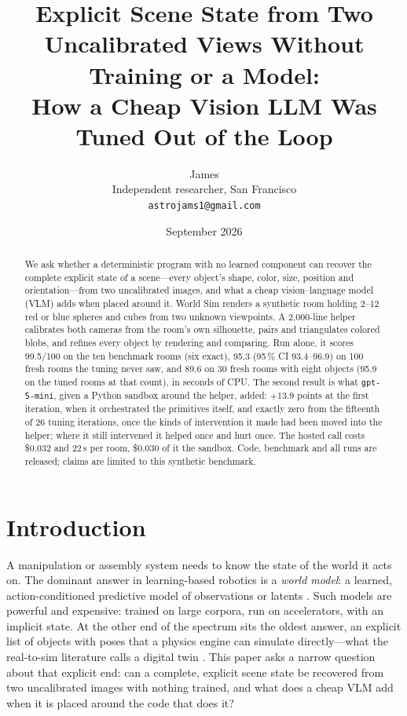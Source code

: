 \documentclass[10pt,a4paper]{article}
\title{\textbf{Explicit Scene State from Two Uncalibrated Views Without Training or a Model:\\ How a Cheap Vision LLM Was Tuned Out of the Loop}}
\author{James\\ Independent researcher, San Francisco\\ \texttt{astrojams1@gmail.com}}
\date{September 2026}
\newcommand{\ws}{World Sim}
\begin{document}
\maketitle

\begin{abstract}
We ask whether a deterministic program with no learned component can recover the complete explicit state of a scene---every object's shape, color, size, position and orientation---from two uncalibrated images, and what a cheap vision--language model (VLM) adds when placed around it. \ws{} renders a synthetic room holding 2--12 red or blue spheres and cubes from two unknown viewpoints. A 2,000-line helper calibrates both cameras from the room's own silhouette, pairs and triangulates colored blobs, and refines every object by rendering and comparing. Run alone, it scores 99.5/100 on the ten benchmark rooms (six exact), 95.3 (95\,\% CI 93.4--96.9) on 100 fresh rooms the tuning never saw, and 89.6 on 30 fresh rooms with eight objects (95.9 on the tuned rooms at that count), in seconds of CPU. The second result is what \texttt{gpt-5-mini}, given a Python sandbox around the helper, added: $+13.9$ points at the first iteration, when it orchestrated the primitives itself, and exactly zero from the fifteenth of 26 tuning iterations, once the kinds of intervention it made had been moved into the helper; where it still intervened it helped once and hurt once. The hosted call costs \$0.032 and 22\,s per room, \$0.030 of it the sandbox. Code, benchmark and all runs are released; claims are limited to this synthetic benchmark.
\end{abstract}

\section{Introduction}

A manipulation or assembly system needs to know the state of the world it acts on. The dominant answer in learning-based robotics is a \emph{world model}: a learned, action-conditioned predictive model of observations or latents \citep{ha2018world,hafner2019dream,hafner2023mastering,assran2025v,nvidia2025cosmos}. Such models are powerful and expensive: trained on large corpora, run on accelerators, with an implicit state. At the other end of the spectrum sits the oldest answer, an explicit list of objects with poses that a physics engine can simulate directly---what the real-to-sim literature calls a digital twin \citep{dai2024automated,chen2024urdformer,mandi2024real2code}. This paper asks a narrow question about that explicit end: can a complete, explicit scene state be recovered from two uncalibrated images with nothing trained, and what does a cheap VLM add when it is placed around the code that does it?
\end{document}
